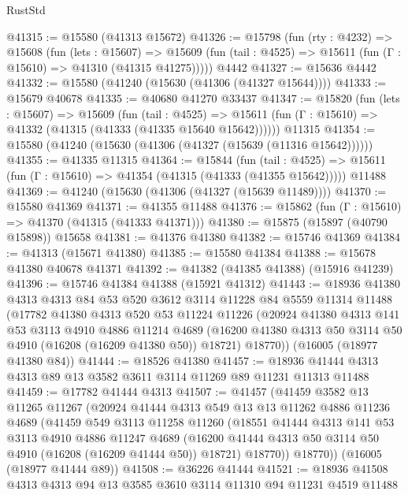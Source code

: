 \begin{lexlean}{RustStd}
\begin{coremodule}
@41315 := @15580 (@41313 @15672)
@41326 := @15798
    (fun (rty : @4232) =>
    @15608
      (fun (lets : @15607) =>
      @15609 (fun (tail : @4525) => @15611 (fun (Γ : @15610) => @41310 (@41315 @41275)))))
    @4442
@41327 := @15636 @4442
@41332 := @15580 (@41240 (@15630 (@41306 (@41327 @15644))))
@41333 := @15679 @40678
@41335 := @40680 @41270 @33437
@41347 := @15820
    (fun (lets : @15607) =>
    @15609
      (fun (tail : @4525) =>
      @15611 (fun (Γ : @15610) => @41332 (@41315 (@41333 (@41335 @15640 @15642))))))
    @11315
@41354 := @15580 (@41240 (@15630 (@41306 (@41327 (@15639 (@11316 @15642))))))
@41355 := @41335 @11315
@41364 := @15844
    (fun (tail : @4525) => @15611 (fun (Γ : @15610) => @41354 (@41315 (@41333 (@41355 @15642)))))
    @11488
@41369 := @41240 (@15630 (@41306 (@41327 (@15639 @11489))))
@41370 := @15580 @41369
@41371 := @41355 @11488
@41376 := @15862 (fun (Γ : @15610) => @41370 (@41315 (@41333 @41371)))
@41380 := @15875 (@15897 (@40790 @15898)) @15658
@41381 := @41376 @41380
@41382 := @15746 @41369
@41384 := @41313 (@15671 @41380)
@41385 := @15580 @41384
@41388 := @15678 @41380 @40678 @41371
@41392 := @41382 (@41385 @41388) (@15916 @41239)
@41396 := @15746 @41384 @41388 (@15921 @41312)
@41443 := @18936
    @41380
    @4313
    @4313
    @84
    @53
    @520
    @3612
    @3114
    @11228
    @84
    @5559
    @11314
    @11488
    (@17782
      @41380
      @4313
      @520
      @53
      @11224
      @11226
      (@20924
        @41380
        @4313
        @141
        @53
        @3113
        @4910
        @4886
        @11214
        @4689
        (@16200 @41380 @4313 @50 @3114 @50 @4910 (@16208 (@16209 @41380 @50)) @18721)
        @18770))
    (@16005 (@18977 @41380 @84))
@41444 := @18526 @41380
@41457 := @18936 @41444 @4313 @4313 @89 @13 @3582 @3611 @3114 @11269 @89 @11231 @11313 @11488
@41459 := @17782 @41444 @4313
@41507 := @41457
    (@41459
      @3582
      @13
      @11265
      @11267
      (@20924
        @41444
        @4313
        @549
        @13
        @13
        @11262
        @4886
        @11236
        @4689
        (@41459
          @549
          @3113
          @11258
          @11260
          (@18551
            @41444
            @4313
            @141
            @53
            @3113
            @4910
            @4886
            @11247
            @4689
            (@16200 @41444 @4313 @50 @3114 @50 @4910 (@16208 (@16209 @41444 @50)) @18721)
            @18770))
        @18770))
    (@16005 (@18977 @41444 @89))
@41508 := @36226 @41444
@41521 := @18936 @41508 @4313 @4313 @94 @13 @3585 @3610 @3114 @11310 @94 @11231 @4519 @11488

\end{coremodule}
\end{lexlean}
